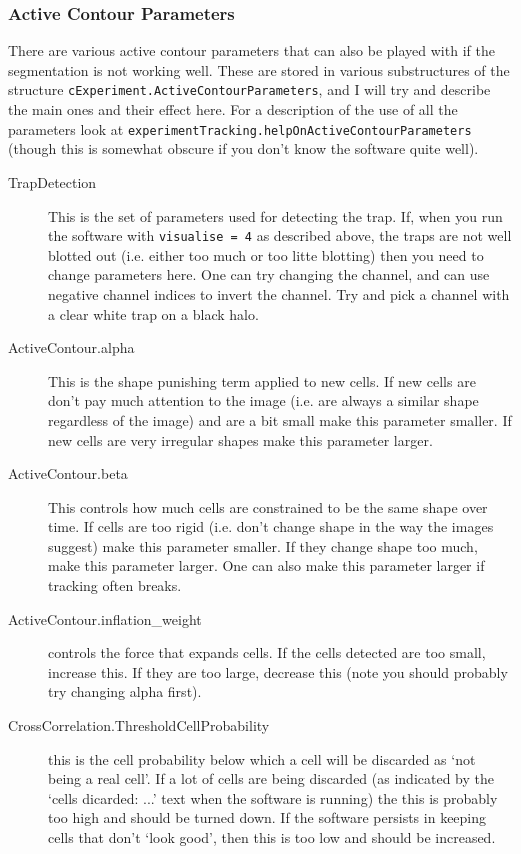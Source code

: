 \subsubsection{Active Contour Parameters}
There are various active contour parameters that can also be played with if the segmentation is not working well. These are stored in various substructures of the structure \texttt{cExperiment.ActiveContourParameters}, and I will try and describe the main ones and their effect here. For a description of the use of all the parameters look at \texttt{experimentTracking.helpOnActiveContourParameters} (though this is somewhat obscure if you don't know the software quite well).
\begin{description}
	\item[TrapDetection] This is the set of parameters used for detecting the trap. If, when you run the software with \texttt{visualise = 4} as described above, the traps are not well blotted out (i.e. either too much or too litte blotting) then you need to change parameters here. One can try changing the channel, and can use negative channel indices to invert the channel. Try and pick a channel with a clear white trap on a black halo.
	\item[ActiveContour.alpha] This is the shape punishing term applied to new cells. If new cells are don't pay much attention to the image (i.e. are always a similar shape regardless of the image) and are a bit small make this parameter smaller. If new cells are very irregular shapes make this parameter larger.
	\item[ActiveContour.beta] This controls how much cells are constrained to be the same shape over time. If cells are too rigid (i.e. don't change shape in the way the images suggest) make this parameter smaller. If they change shape too much, make this parameter larger. One can also make this parameter larger if tracking often breaks.
	\item[ActiveContour.inflation\_weight] controls the force that expands cells. If the cells detected are too small, increase this. If they are too large, decrease this (note you should probably try changing alpha first).
	\item[CrossCorrelation.ThresholdCellProbability] this is the cell probability below which a cell will be discarded as `not being a real cell'. If a lot of cells are being discarded (as indicated by the `cells dicarded: ...' text when the software is running) the this is probably too high and should be turned down. If the software persists in keeping cells that don't `look good', then this is too low and should be increased.
\end{description}

